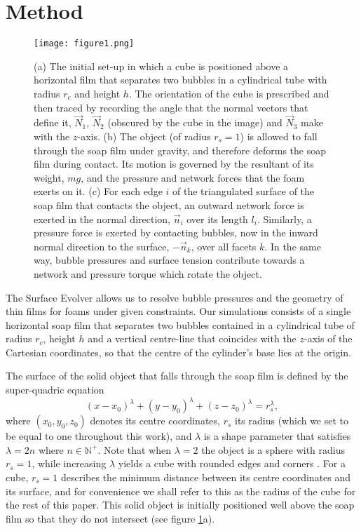 \documentclass[preprint]{revtex4-1}
\begin{document}
\section{Method}
	\label{sec:method}


\begin{figure}
  \centering
		\texttt{[image: figure1.png]}
  \caption{(a) The initial set-up in which a cube is positioned above a horizontal film that separates two bubbles in a cylindrical tube with radius $r_c$ and height $h$. The orientation of the cube is prescribed and then traced by recording the angle that the normal vectors that define it, $\vec{N}_1$, $\vec{N}_2$ (obscured by the cube in the image) and $\vec{N}_3$ make with the $z$-axis. (b) The object (of radius $r_s=1$) is allowed to fall through the soap film under gravity, and therefore deforms the soap film during contact. Its motion is governed by the resultant of its weight, $mg$, and the pressure and network forces that the foam exerts on it. (c) For each edge $i$ of the triangulated surface of the soap film that contacts the object, an outward network force is exerted in the normal direction, $\vec{n}_i$ over its length $l_i$. Similarly, a pressure force is exerted by contacting bubbles, now in the inward normal direction to the surface, $-\vec{n}_k$, over all facets $k$. In the same way, bubble pressures and surface tension contribute towards a network and pressure torque which rotate the object.}
  \label{fig:method}
\end{figure}



The Surface Evolver \cite{Brakke} allows us to resolve bubble pressures and the geometry of thin films for foams under given constraints. Our simulations consists of a single horizontal soap film that separates two bubbles contained in a cylindrical tube of radius $r_c$, height $h$ and a vertical centre-line that coincides with the $z$-axis of the Cartesian coordinates, so that the centre of the cylinder's base lies at the origin. 

The surface of the solid object that falls through the soap film is defined by the super-quadric equation
\begin{equation}
\left(x-x_0\right)^{\lambda}+\left(y-y_0\right)^{\lambda}+\left(z-z_0\right)^{\lambda}=r_s^{\lambda},
\label{eq:superquadric}
\end{equation}
where $\left(x_0,y_0,z_0\right)$ denotes its centre coordinates, $r_s$ its radius (which we set to be equal to one throughout this work), and $\lambda$ is a shape parameter that satisfies $\lambda=2n$ where $n\in\mathbb{N}^+$. Note that when $\lambda=2$ the object is a sphere with radius $r_s=1$, while increasing $\lambda$ yields a cube with rounded edges and corners \cite{Jaklic00,Zhou01}. For a cube, $r_s=1$ describes the minimum distance between its centre coordinates and its surface, and for convenience we shall refer to this as the radius of the cube for the rest of this paper. This solid object is initially positioned well above the soap film so that they do not intersect (see figure \ref{fig:method}a). 
\end{document}
